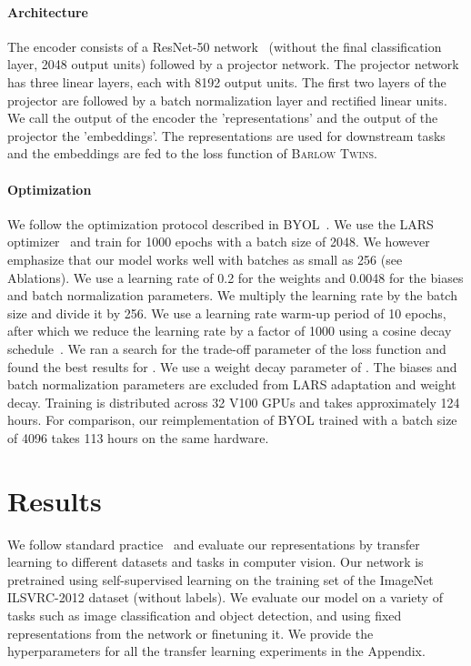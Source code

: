 \documentclass{article}
\newcommand{\AlgoName}{\textsc{Barlow Twins}}
\begin{document}
\paragraph{Architecture} 
The encoder consists of a ResNet-50 network~\cite{he2016deep} (without the final classification layer, 2048 output units) followed by a projector network. The projector network has three linear layers, each with 8192 output units. The first two layers of the projector are followed by a batch normalization layer and rectified linear units. We call the output of the encoder the 'representations' and the output of the projector the 'embeddings'. The representations are used for downstream tasks and the embeddings are fed to the loss function of \AlgoName{}.

\paragraph{Optimization} 
We follow the optimization protocol described in \textsc{BYOL}~\cite{grill2020bootstrap}. We use the LARS optimizer~\cite{you2017large} and train for 1000 epochs with a batch size of 2048. We however emphasize that our model works well with batches as small as 256 (see Ablations). We use a learning rate of 0.2 for the weights and 0.0048 for the biases and batch normalization parameters. We multiply the learning rate by the batch size and divide it by 256. We use a learning rate warm-up period of 10 epochs, after which we reduce the learning rate by a factor of 1000 using a cosine decay schedule~\cite{loshchilov2016sgdr}. We ran a search for the trade-off parameter  of the loss function and found the best results for . We use a weight decay parameter of . The biases and batch normalization parameters are excluded from LARS adaptation and weight decay. Training is distributed across 32 V100 GPUs and takes approximately 124 hours. For comparison, our reimplementation of \textsc{BYOL} trained with a batch size of 4096 takes 113 hours on the same hardware. \section{Results}

We follow standard practice~\cite{goyal2019scaling} and evaluate our representations by transfer learning to different datasets and tasks in computer vision.
Our network is pretrained using self-supervised learning on the training set of the ImageNet ILSVRC-2012 dataset \cite{deng2009imagenet} (without labels). We evaluate our model on a variety of tasks such as image classification and object detection, and using fixed representations from the network or finetuning it. We provide the hyperparameters for all the transfer learning experiments in the Appendix.
\end{document}
